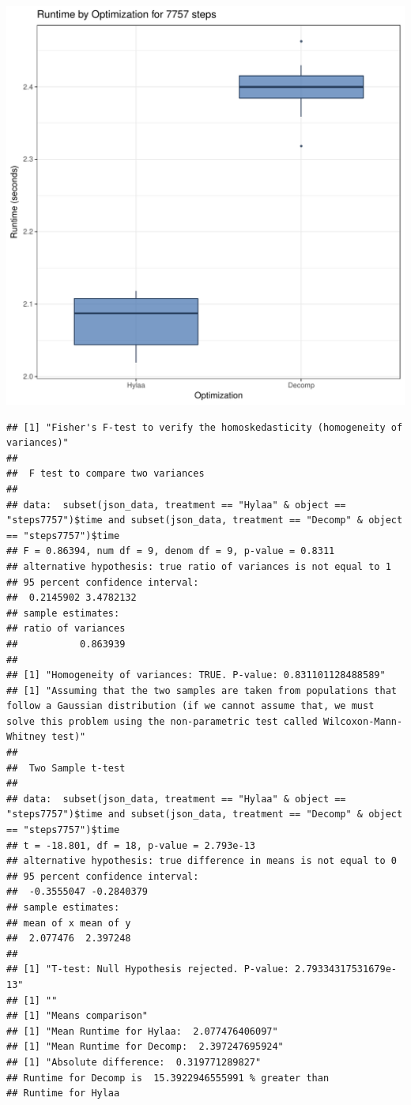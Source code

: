 \documentclass{article}\usepackage[]{graphicx}\usepackage[]{color}
\makeatletter
\def\maxwidth{ %
  \ifdim\Gin@nat@width>\linewidth
    \linewidth
  \else
    \Gin@nat@width
  \fi
}
\newenvironment{kframe}{%
 \def\at@end@of@kframe{}%
 \ifinner\ifhmode%
  \def\at@end@of@kframe{\end{minipage}}%
  \begin{minipage}{\columnwidth}%
 \fi\fi%
 \def\FrameCommand##1{\hskip\@totalleftmargin \hskip-\fboxsep
 \colorbox{shadecolor}{##1}\hskip-\fboxsep
     \hskip-\linewidth \hskip-\@totalleftmargin \hskip\columnwidth}%
 \MakeFramed {\advance\hsize-\width
   \@totalleftmargin\z@ \linewidth\hsize
   \@setminipage}}%
 {\par\unskip\endMakeFramed%
 \at@end@of@kframe}
\newenvironment{knitrout}{}{} %
\makeatother
\begin{document}
\begin{knitrout}
\color{fgcolor}
\includegraphics[width=\maxwidth]{figure/RH2_steps7757-1} 
\begin{kframe}\begin{verbatim}
## [1] "Fisher's F-test to verify the homoskedasticity (homogeneity of variances)"
## 
## 	F test to compare two variances
## 
## data:  subset(json_data, treatment == "Hylaa" & object == "steps7757")$time and subset(json_data, treatment == "Decomp" & object == "steps7757")$time
## F = 0.86394, num df = 9, denom df = 9, p-value = 0.8311
## alternative hypothesis: true ratio of variances is not equal to 1
## 95 percent confidence interval:
##  0.2145902 3.4782132
## sample estimates:
## ratio of variances 
##           0.863939 
## 
## [1] "Homogeneity of variances: TRUE. P-value: 0.831101128488589"
## [1] "Assuming that the two samples are taken from populations that follow a Gaussian distribution (if we cannot assume that, we must solve this problem using the non-parametric test called Wilcoxon-Mann-Whitney test)"
## 
## 	Two Sample t-test
## 
## data:  subset(json_data, treatment == "Hylaa" & object == "steps7757")$time and subset(json_data, treatment == "Decomp" & object == "steps7757")$time
## t = -18.801, df = 18, p-value = 2.793e-13
## alternative hypothesis: true difference in means is not equal to 0
## 95 percent confidence interval:
##  -0.3555047 -0.2840379
## sample estimates:
## mean of x mean of y 
##  2.077476  2.397248 
## 
## [1] "T-test: Null Hypothesis rejected. P-value: 2.79334317531679e-13"
## [1] ""
## [1] "Means comparison"
## [1] "Mean Runtime for Hylaa:  2.077476406097"
## [1] "Mean Runtime for Decomp:  2.397247695924"
## [1] "Absolute difference:  0.319771289827"
## Runtime for Decomp is  15.3922946555991 % greater than 
## Runtime for Hylaa
\end{verbatim}
\end{kframe}
\end{knitrout}
\end{document}
